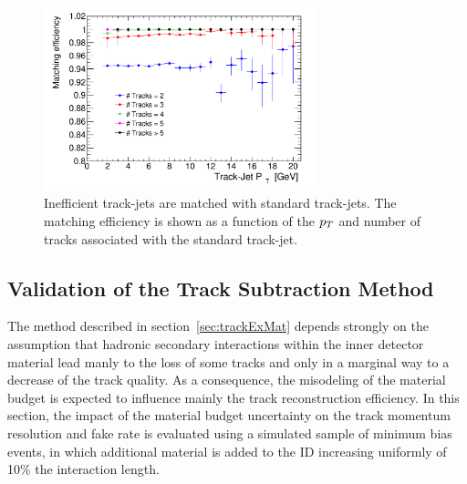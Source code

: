 \begin{figure}[tp]
\centering
\includegraphics[width=0.7\textwidth]{figure/trackjet/T7/Sys_eff_n2.pdf}
\caption{Inefficient track-jets are matched with standard track-jets. The matching efficiency is shown as a function of 
	the $p_{T}$ and number of tracks associated with the  standard track-jet.}

\label{fig:inef_tj_std_eff}
\end{figure}    


\subsection{Validation of the Track Subtraction Method} %
\label{sec:valid}
The method described in section~\ref{sec:trackExMat} depends strongly on the assumption that 
hadronic secondary interactions within the inner detector material  lead manly to the loss of 
some tracks and only in a marginal way to a decrease of the track quality. As a consequence, the misodeling 
of the material budget is expected to influence mainly the track reconstruction efficiency.
In this section, the impact  of the  material budget uncertainty on the track momentum resolution 
and fake rate is evaluated using a simulated  sample of minimum bias events, in which additional material 
is added to the ID increasing uniformly of 10\% the interaction length.  

